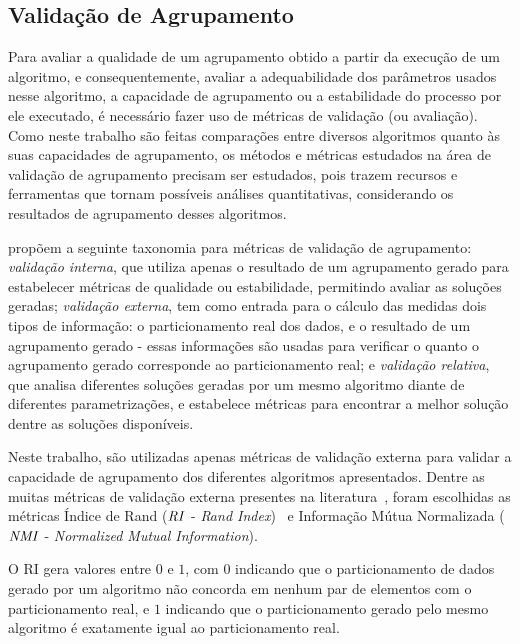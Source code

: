 \documentclass[
    12pt,                %
    oneside,            %
    a4paper,            %
    english,            %
    brazil                %
    ]{abntex2ppgsi}
\begin{document}
\subsection{Validação de Agrupamento}
\label{sec:clustering:eval}

Para avaliar a qualidade de um agrupamento obtido a partir da execução de um algoritmo, e consequentemente, avaliar a adequabilidade dos parâmetros usados nesse algoritmo, a capacidade de agrupamento ou a estabilidade do processo por ele executado, é necessário fazer uso de métricas de validação (ou avaliação).
Como neste trabalho são feitas comparações entre diversos algoritmos quanto às suas capacidades de agrupamento, os métodos e métricas estudados na área de validação de agrupamento precisam ser estudados, pois trazem recursos e ferramentas que tornam possíveis análises quantitativas, considerando os resultados de agrupamento desses algoritmos.

 propõem a seguinte taxonomia para métricas de validação de agrupamento: \textit{validação interna}, que utiliza apenas o resultado de um agrupamento gerado para estabelecer métricas de qualidade ou estabilidade, permitindo avaliar as soluções geradas; \textit{validação externa}, tem como entrada para o cálculo das medidas dois tipos de informação: o particionamento real dos dados, e o resultado de um agrupamento gerado - essas informações são usadas para verificar o quanto o agrupamento gerado corresponde ao particionamento real; e \textit{validação relativa}, que analisa diferentes soluções geradas por um mesmo algoritmo diante de diferentes parametrizações, e estabelece métricas para encontrar a melhor solução dentre as soluções disponíveis.

Neste trabalho, são utilizadas apenas métricas de validação externa para validar a capacidade de agrupamento dos diferentes algoritmos apresentados.
Dentre as muitas métricas de validação externa presentes na literatura~\cite{Halkidi2002a,Halkidi2002b}, foram escolhidas as métricas Índice de Rand ($\text{\textit{RI}}$ - \textit{Rand Index})~\cite{Rand1971} e Informação Mútua Normalizada ($\text{\textit{NMI}}$ - \textit{Normalized Mutual Information}).

O RI gera valores entre $0$ e $1$, com $0$ indicando que o particionamento de dados gerado por um algoritmo não concorda em nenhum par de elementos com o particionamento real, e $1$ indicando que o particionamento gerado pelo mesmo algoritmo é exatamente igual ao particionamento real.
\end{document}
